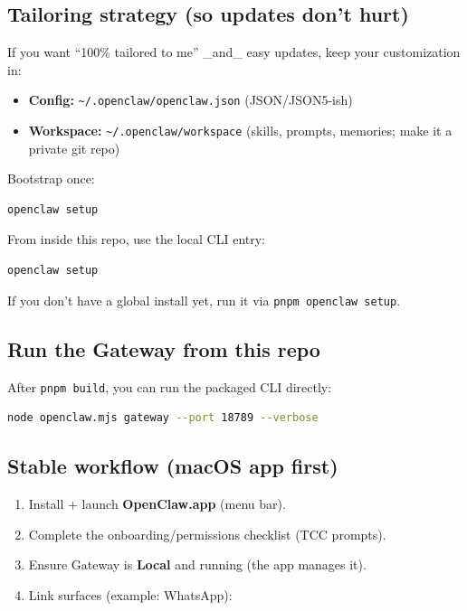 \subsection{Tailoring strategy (so updates don’t hurt)}


If you want “100\% tailored to me” \_and\_ easy updates, keep your customization in:

\begin{itemize}
  \item \textbf{Config:} \texttt{\textasciitilde{}/.openclaw/openclaw.json} (JSON/JSON5-ish)
  \item \textbf{Workspace:} \texttt{\textasciitilde{}/.openclaw/workspace} (skills, prompts, memories; make it a private git repo)
\end{itemize}


Bootstrap once:

\begin{lstlisting}[language=bash]
openclaw setup
\end{lstlisting}


From inside this repo, use the local CLI entry:

\begin{lstlisting}[language=bash]
openclaw setup
\end{lstlisting}


If you don’t have a global install yet, run it via \texttt{pnpm openclaw setup}.

\subsection{Run the Gateway from this repo}


After \texttt{pnpm build}, you can run the packaged CLI directly:

\begin{lstlisting}[language=bash]
node openclaw.mjs gateway --port 18789 --verbose
\end{lstlisting}


\subsection{Stable workflow (macOS app first)}


\begin{enumerate}
  \item Install + launch \textbf{OpenClaw.app} (menu bar).
  \item Complete the onboarding/permissions checklist (TCC prompts).
  \item Ensure Gateway is \textbf{Local} and running (the app manages it).
  \item Link surfaces (example: WhatsApp):
\end{enumerate}


